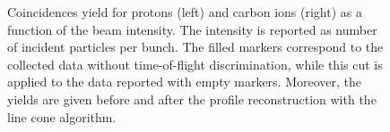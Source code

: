 \begin{figure} [!h]
\caption{Coincidences yield for protons (left) and carbon ions (right) as a function of the beam intensity. The intensity is reported as number of incident particles per bunch. The filled markers correspond to the collected data without time-of-flight discrimination, while this cut is applied to the data reported with empty markers. Moreover, the yields are given before and after the profile reconstruction with the line cone algorithm.}
\label{fig:coincidences}
\end{figure}

